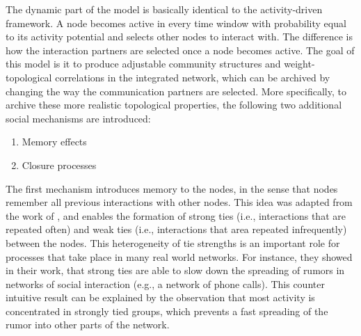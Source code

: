 The dynamic part of the model is basically identical to the activity-driven framework.
A node becomes active in every time window with probability equal to its activity potential and selects other nodes to interact with.
The difference is how the interaction partners are selected once a node becomes active.
The goal of this model is it to produce adjustable community structures and weight-topological correlations in the integrated network, which can be archived by changing the way the communication partners are selected.
More specifically, to archive these more realistic topological properties, the following two additional social mechanisms are introduced:

\begin{enumerate}
    \item Memory effects
    \item Closure processes
\end{enumerate}

The first mechanism introduces memory to the nodes, in the sense that nodes remember all previous interactions with other nodes.
This idea was adapted from the work of \citet{Karsai2014}, and enables the formation of strong ties (i.e., interactions that are repeated often) and weak ties (i.e., interactions that area repeated infrequently) between the nodes.
This heterogeneity of tie strengths is an important role for processes that take place in many real world networks.
For instance, they showed in their work, that strong ties are able to slow down the spreading of rumors in networks of social interaction (e.g., a network of phone calls).
This counter intuitive result can be explained by the observation that most activity is concentrated in strongly tied groups, which prevents a fast spreading of the rumor into other parts of the network.

